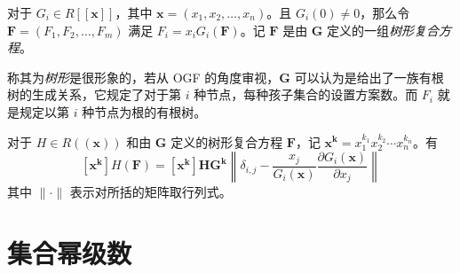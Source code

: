 \begin{definition}[树形复合方程]
对于 $G_i \in R[[\mathbf x]]$，其中 $\mathbf x = (x_1, x_2, \dots, x_n)$。且 $G_i(0) \neq 0$，那么令 $\mathbf F = (F_1, F_2, \dots, F_m)$ 满足 $F_i = x_i G_i (\mathbf F)$。记 $\mathbf F$ 是由 $\mathbf G$ 定义的一组\emph{树形复合方程}。
\end{definition}

称其为\emph{树形}是很形象的，若从 OGF 的角度审视，$\mathbf G$ 可以认为是给出了一族有根树的生成关系，它规定了对于第 $i$ 种节点，每种孩子集合的设置方案数。而 $F_i$ 就是规定以第 $i$ 种节点为根的有根树。

\begin{theorem}[多元 Lagrange]
对于 $H \in R((\mathbf x))$ 和由 $\mathbf G$ 定义的树形复合方程 $\mathbf F$，记 $\mathbf x^{\mathbf k} = x_1^{k_1} x_2^{k_2} \cdots x_n^{k_n}$。有
$$
[\mathbf x^{\mathbf k}]H(\mathbf F) = [\mathbf x^{\mathbf k}] \mathbf H \mathbf G^{\mathbf k} \left \| 
\delta_{i,j} - \frac{x_j}{G_i(\mathbf x)} \frac{\partial G_i (\mathbf x)}{\partial x_j}
\right \|
$$
其中 $\|\cdot\|$ 表示对所括的矩阵取行列式。
\end{theorem}



\section{集合幂级数}

